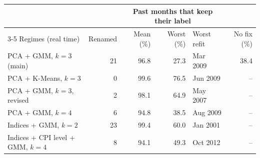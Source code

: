 \begin{tabular}{lrrrlr}
\toprule
 &  & \multicolumn{3}{c}{Past months that keep their label} &  \\
\cmidrule(lr){3-5}
Regimes (real time) & Renamed & Mean (\%) & Worst (\%) & Worst refit & No fix (\%) \\
\midrule
PCA + GMM, $k=3$ (main) & 21 & 96.8 & 27.3 & Mar 2009 & 38.4 \\
PCA + K-Means, $k=3$ & 0 & 99.6 & 76.5 & Jun 2009 & -- \\
PCA + GMM, $k=3$, revised & 2 & 98.1 & 64.9 & May 2007 & -- \\
PCA + GMM, $k=4$ & 6 & 94.8 & 38.5 & Aug 2009 & -- \\
Indices + GMM, $k=2$ & 23 & 99.4 & 60.0 & Jan 2001 & -- \\
Indices + CPI level + GMM, $k=4$ & 8 & 94.1 & 49.3 & Oct 2012 & -- \\
\bottomrule
\end{tabular}

